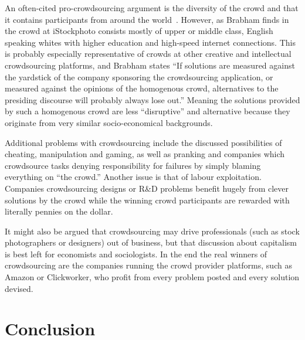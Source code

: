 \documentclass{sig-alternate}
\begin{document}
An often-cited pro-crowdsourcing argument is the diversity of the crowd and
that it contains participants from around the world~\cite{howe2006rise,
	howe2009crowdsourcing}. However, as Brabham finds 
in~\cite{brabham2008moving} the crowd at iStockphoto consists mostly of upper
or middle class, English speaking whites with higher education and high-speed
internet connections. This is probably especially representative of crowds at
other creative and intellectual crowdsourcing platforms, and Brabham states
``If solutions are measured against the yardstick of the company sponsoring the
crowdsourcing application, or measured against the opinions of the homogenous
crowd, alternatives to the presiding discourse will probably always lose out.''
Meaning the solutions provided by such a homogenous crowd are less
``disruptive'' and alternative because they originate from very similar
socio-economical backgrounds.

Additional problems with crowdsourcing include the discussed possibilities of
cheating, manipulation and gaming, as well as pranking and companies which
crowdsource tasks denying responsibility for failures by simply blaming
everything on ``the crowd.'' Another issue is that of labour exploitation.
Companies crowdsourcing designs or R\&D problems benefit hugely from clever
solutions by the crowd while the winning crowd participants are rewarded with
literally pennies on the dollar. 

It might also be argued that crowdsourcing may drive professionals (such as
stock photographers or designers) out of business, but that discussion about
capitalism is best left for economists and sociologists. In the end the real
winners of crowdsourcing are the companies running the crowd provider
platforms, such as Amazon or Clickworker, who profit from every problem posted
and every solution devised.



\section{Conclusion}
\end{document}
